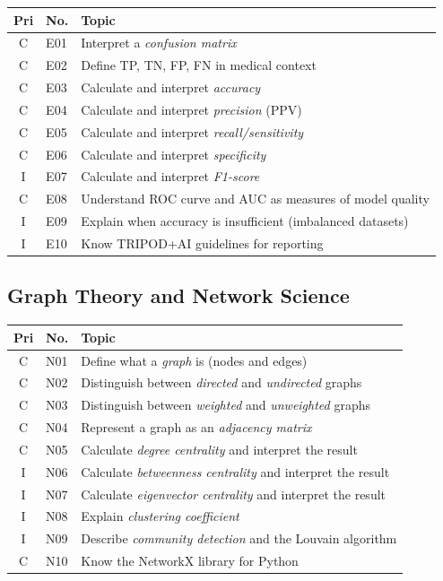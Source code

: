 \documentclass[11pt,a4paper]{article}
\begin{document}
\begin{longtable}{@{}clp{9cm}@{}}
\toprule
\textbf{Pri} & \textbf{No.} & \textbf{Topic} \\
\midrule
\endfirsthead
\midrule
\endhead
\midrule
\endfoot
\bottomrule
\endlastfoot
C & E01 & Interpret a \emph{confusion matrix} \\
C & E02 & Define TP, TN, FP, FN in medical context \\
C & E03 & Calculate and interpret \emph{accuracy} \\
C & E04 & Calculate and interpret \emph{precision} (PPV) \\
C & E05 & Calculate and interpret \emph{recall/sensitivity} \\
C & E06 & Calculate and interpret \emph{specificity} \\
I & E07 & Calculate and interpret \emph{F1-score} \\
C & E08 & Understand ROC curve and AUC as measures of model quality \\
I & E09 & Explain when accuracy is insufficient (imbalanced datasets) \\
I & E10 & Know TRIPOD+AI guidelines for reporting \citep{collins2024tripodai} \\
\end{longtable}

\subsection{Graph Theory and Network Science}

\begin{longtable}{@{}clp{9cm}@{}}
\toprule
\textbf{Pri} & \textbf{No.} & \textbf{Topic} \\
\midrule
\endfirsthead
\midrule
\endhead
\midrule
\endfoot
\bottomrule
\endlastfoot
C & N01 & Define what a \emph{graph} is (nodes and edges) \\
C & N02 & Distinguish between \emph{directed} and \emph{undirected} graphs \\
C & N03 & Distinguish between \emph{weighted} and \emph{unweighted} graphs \\
C & N04 & Represent a graph as an \emph{adjacency matrix} \\
C & N05 & Calculate \emph{degree centrality} and interpret the result \\
I & N06 & Calculate \emph{betweenness centrality} and interpret the result \\
I & N07 & Calculate \emph{eigenvector centrality} and interpret the result \\
I & N08 & Explain \emph{clustering coefficient} \\
I & N09 & Describe \emph{community detection} and the Louvain algorithm \\
C & N10 & Know the NetworkX library for Python \\
\end{longtable}
\end{document}
